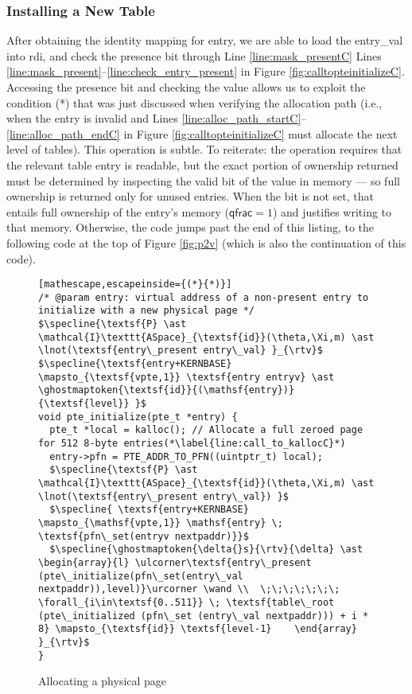  \subsubsection{Installing a New Table}
 After obtaining the identity mapping for \textsf{entry}, we are able to load the \textsf{entry\_val} into \textsf{rdi}, and check the presence bit through
\ifPLDI
Line \ref{line:mask_presentC} %
\else
Lines \ref{line:mask_present}--\ref{line:check_entry_present} 
\fi
in Figure \ref{fig:calltopteinitializeC}.
Accessing the presence bit and checking the value allows us to exploit the condition (*) that was just discussed when verifying the allocation
path (i.e., when the entry is invalid and Lines \ref{line:alloc_path_startC}--\ref{line:alloc_path_endC} in Figure \ref{fig:calltopteinitializeC}
must allocate the next level of tables).
This operation is subtle. To reiterate: the operation requires that the relevant table entry is readable, but the exact portion of ownership
returned must be determined by inspecting the valid bit of the value in memory --- so full ownership is returned only for unused entries.
When the bit is not set, that entails full ownership of the entry's memory ($\textsf{qfrac} = 1$) and justifies writing to that memory.
Otherwise, the code jumps past the end of this listing, to the following code at the top of Figure \ref{fig:p2v} (which is also the
continuation of this code).

\begin{figure}\footnotesize
  \begin{lstlisting}[mathescape,escapeinside={(*}{*)}]
/* @param entry: virtual address of a non-present entry to initialize with a new physical page */
$\specline{\textsf{P} \ast \mathcal{I}\texttt{ASpace}_{\textsf{id}}(\theta,\Xi,m) \ast \lnot(\textsf{entry\_present entry\_val} }_{\rtv}$
$\specline{\textsf{entry+KERNBASE} \mapsto_{\textsf{vpte,1}} \textsf{entry entryv} \ast \ghostmaptoken{\textsf{id}}{(\mathsf{entry})}{\textsf{level}} }$
void pte_initialize(pte_t *entry) {
  pte_t *local = kalloc(); // Allocate a full zeroed page for 512 8-byte entries(*\label{line:call_to_kallocC}*)
  entry->pfn = PTE_ADDR_TO_PFN((uintptr_t) local);
  $\specline{\textsf{P} \ast \mathcal{I}\texttt{ASpace}_{\textsf{id}}(\theta,\Xi,m) \ast \lnot(\textsf{entry\_present entry\_val}) }$
  $\specline{ \textsf{entry+KERNBASE} \mapsto_{\mathsf{vpte,1}} \mathsf{entry} \; \textsf{pfn\_set(entryv nextpaddr)}}$
  $\specline{\ghostmaptoken{\delta{}s}{\rtv}{\delta} \ast \begin{array}{l} \ulcorner\textsf{entry\_present (pte\_initialize(pfn\_set(entry\_val nextpaddr)),level)}\urcorner \wand \\  \;\;\;\;\;\;\; \forall_{i\in\textsf{0..511}} \; \textsf{table\_root (pte\_initialized (pfn\_set (entry\_val nextpaddr))) + i * 8} \mapsto_{\textsf{id}} \textsf{level-1}    \end{array}  }_{\rtv}$
}
\end{lstlisting}
\vspace{-1em}
\caption{Allocating a physical page }
\label{pteinitializespecC}
\vspace{-1em}
\end{figure}

